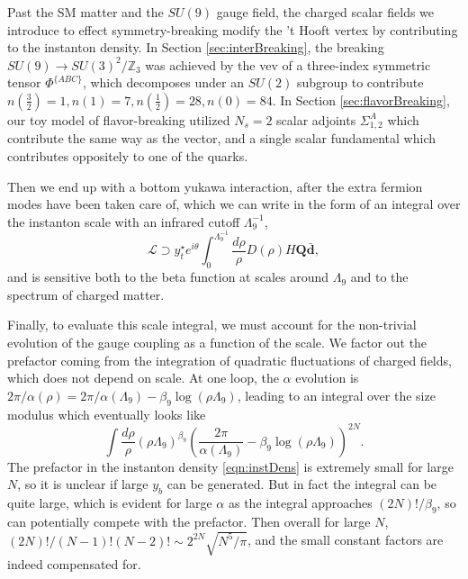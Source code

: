 \documentclass[11pt,a4paper]{article}
\newcommand{\half}{\frac{1}{2}}
\begin{document}
Past the SM matter and the $SU(9)$ gauge field, the charged scalar fields we introduce to effect symmetry-breaking modify the 't Hooft vertex by contributing to the instanton density. In Section \ref{sec:interBreaking}, the breaking $SU(9) \rightarrow SU(3)^2/\mathbb{Z}_3$ was achieved by the vev of a three-index symmetric tensor $\Phi^{\lbrace ABC \rbrace}$, which decomposes under an $SU(2)$ subgroup to contribute $n(\frac{3}{2})=1, n(1)=7, n(\half)=28, n(0)=84$. In Section \ref{sec:flavorBreaking}, our toy model of flavor-breaking utilized $N_s=2$ scalar adjoints $\Sigma^A_{1,2}$ which contribute the same way as the vector, and a single scalar fundamental which contributes oppositely to one of the quarks.

Then we end up with a bottom yukawa interaction, after the extra fermion modes have been taken care of, which we can write in the form of an integral over the instanton scale with an infrared cutoff $\Lambda_9^{-1}$, 
\begin{equation} \label{eqn:inducedDownYuk}
    \mathcal{L} \supset y_t^\star e^{i\theta} \int_0^{\Lambda_9^{-1}} \frac{d\rho}{\rho} D(\rho) H \mathbf{Q} \mathbf{\bar d},
\end{equation}
and is sensitive both to the beta function at scales around $\Lambda_9$ and to the spectrum of charged matter.

Finally, to evaluate this scale integral, we must account for the non-trivial evolution of the gauge coupling as a function of the scale. We factor out the prefactor coming from the integration of quadratic fluctuations of charged fields, which does not depend on scale.
At one loop, the $\alpha$ evolution is $2\pi/\alpha(\rho) = 2\pi/\alpha(\Lambda_9) - \beta_9 \log (\rho \Lambda_9)$, leading to an integral over the size modulus which eventually looks like
\begin{equation}
    \int \frac{d\rho}{\rho} \left(\rho \Lambda_9\right)^{\beta_9} \left( \frac{2\pi}{\alpha(\Lambda_9)} - \beta_9 \log (\rho \Lambda_9)\right)^{2N}.
\end{equation}
The prefactor in the instanton density \eqref{eqn:instDens} is extremely small for large $N$, so it is unclear if large $y_b$ can be generated. But in fact the integral can be quite large, which is evident for large $\alpha$ as the integral approaches $(2N)!/\beta_9$, so can potentially compete with the prefactor. Then overall for large $N$, $(2N)!/(N-1)!(N-2)! \sim 2^{2N}\sqrt{N^5/\pi}$, and the small constant factors are indeed compensated for. 



\end{document}
